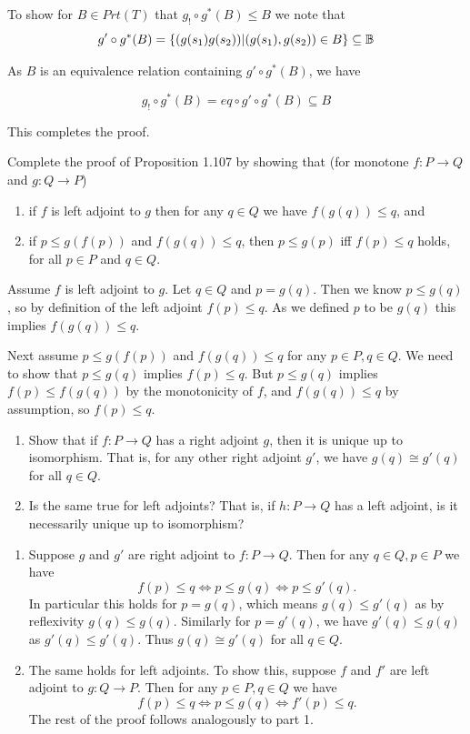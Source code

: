 \bigskip\noindent
To show for $B\in Prt(T)$ that $g_!\circ g^*(B)\leq B$ we note that 
$$g'\circ g^*(B) = \{(g(s_1)g(s_2))| (g(s_1),g(s_2))\in B\}\subseteq \mathbb{B}$$

\bigskip\noindent
As $B$ is an equivalence relation containing $g'\circ g^*(B)$, we have 

$$g_!\circ g^*(B) = eq\circ g' \circ g^*(B)\subseteq B$$

\bigskip\noindent
This completes the proof.


Complete the proof of Proposition 1.107 by showing that (for monotone $f:P\to Q$ and $g:Q\to P$)
\begin{enumerate}
	\item if $f$ is left adjoint to $g$ then for any $q\in Q$ we have $f(g(q))\leq q$, and
	\item if $p\leq g(f(p))$ and $f(g(q))\leq q$, then $p\leq g(p)$ iff $f(p)\leq q$ holds, for all $p\in P$ and $q\in Q$.
\end{enumerate}

\solution
Assume $f$ is left adjoint to $g$.  Let $q\in Q$ and $p=g(q)$. Then we know $p\leq g(q)$, so by definition of the left adjoint $f(p)\leq q$.  As we defined $p$ to be $g(q)$ this implies $f(g(q))\leq q$.

Next assume $p\leq g(f(p))$ and $f(g(q))\leq q$ for any $p\in P, q\in Q$.  We need to show that $p\leq g(q)$ implies $f(p)\leq q$.  But $p\leq g(q)$ implies $f(p)\leq f(g(q))$ by the monotonicity of $f$, and $f(g(q))\leq q$ by assumption, so $f(p)\leq q$.

\begin{enumerate}
	\item Show that if $f:P\to Q$ has a right adjoint $g$, then it is unique up to isomorphism.  That is, for any other right adjoint $g'$, we have $g(q)\cong g'(q)$ for all $q\in Q$.
	\item Is the same true for left adjoints?  That is, if $h:P\to Q$ has a left adjoint, is it necessarily unique up to isomorphism?
\end{enumerate}

\solution
\begin{enumerate}
\item Suppose $g$ and $g'$ are right adjoint to $f:P\to Q$.  Then for any $q\in Q, p\in P$ we have
$$f(p)\leq q\iff p\leq g(q)\iff p\leq g'(q).$$
In particular this holds for $p=g(q)$, which means $g(q)\leq g'(q)$ as by reflexivity $g(q)\leq g(q)$.  Similarly for $p=g'(q)$, we have $g'(q)\leq g(q)$ as $g'(q)\leq g'(q)$.  Thus $g(q)\cong g'(q)$ for all $q\in Q$.

\item The same holds for left adjoints.  To show this, suppose $f$ and $f'$ are left adjoint to $g:Q\to P$.  Then for any $p\in P,q\in Q$ we have
$$f(p)\leq q\iff p\leq g(q)\iff f'(p)\leq q.$$
The rest of the proof follows analogously to part 1.
\end{enumerate}

